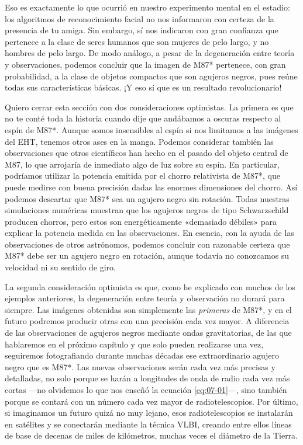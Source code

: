 Eso es exactamente lo que ocurrió en nuestro experimento mental en el estadio: los algoritmos de reconocimiento facial no nos informaron con certeza de la presencia de tu amiga. Sin embargo, sí nos indicaron con gran confianza que pertenece a la clase de seres humanos que son mujeres de pelo largo, y no hombres de pelo largo. De modo análogo, a pesar de la degeneración entre teoría y observaciones, podemos concluir que la imagen de M87* pertenece, con gran probabilidad, a la clase de objetos compactos que son agujeros negros, pues reúne todas sus características básicas. ¡Y eso sí que es un resultado revolucionario!

Quiero cerrar esta sección con dos consideraciones optimistas. La primera es que no te conté toda la historia cuando dije que andábamos a oscuras respecto al espín de M87*. Aunque somos insensibles al espín si nos limitamos a las imágenes del EHT, tenemos otros ases en la manga. Podemos considerar también las observaciones que otros científicos han hecho en el pasado del objeto central de M87, lo que arrojaría de inmediato algo de luz sobre su espín. En particular, podríamos utilizar la potencia emitida por el chorro relativista de M87*, que puede medirse con buena precisión dadas las enormes dimensiones del chorro. Así podemos descartar que M87* sea un agujero negro sin rotación. Todas nuestras simulaciones numéricas muestran que los agujeros negros de tipo Schwarzschild producen chorros, pero estos son energéticamente «demasiado débiles» para explicar la potencia medida en las observaciones. En esencia, con la ayuda de las observaciones de otros astrónomos, podemos concluir con razonable certeza que M87* debe ser un agujero negro en rotación, aunque todavía no conozcamos su velocidad ni su sentido de giro.

La segunda consideración optimista es que, como he explicado con muchos de los ejemplos anteriores, la degeneración entre teoría y observación no durará para siempre. Las imágenes obtenidas son simplemente las \emph{primeras} de M87*, y en el futuro podremos producir otras con una precisión cada vez mayor. A diferencia de las observaciones de agujeros negros mediante ondas gravitatorias, de las que hablaremos en el próximo capítulo y que solo pueden realizarse una vez, seguiremos fotografiando durante muchas décadas ese extraordinario agujero negro que es M87*. Las nuevas observaciones serán cada vez más precisas y detalladas, no solo porque se harán a longitudes de onda de radio cada vez más cortas ---no olvidemos lo que nos enseñó la ecuación \eqref{eq:07-01}---, sino también porque se contará con un número cada vez mayor de radiotelescopios. Por último, si imaginamos un futuro quizá no muy lejano, esos radiotelescopios se instalarán en satélites y se conectarán mediante la técnica VLBI, creando entre ellos líneas de base de decenas de miles de kilómetros, muchas veces el diámetro de la Tierra.

